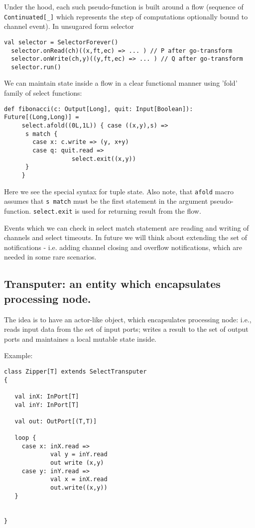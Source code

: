\documentclass[12pt]{article}
\begin{document}
  Under the hood, each such pseudo-function is built around a flow (sequence of \verb|Continuated[_]| which represents the step of computations optionally bound to channel event).  In unsugared form selector 

\begin{Verbatim}[fontsize=\small]
  val selector = SelectorForever()
  selector.onRead(ch)((x,ft,ec) => ... ) // P after go-transform
  selector.onWrite(ch,y)((y,ft,ec) => ... ) // Q after go-transform
  selector.run()
\end{Verbatim}

 We can maintain state inside a flow in a clear functional manner  using 'fold' family of select functions:

\begin{Verbatim}[fontsize=\small]
  def fibonacci(c: Output[Long], quit: Input[Boolean]): Future[(Long,Long)] =
     select.afold((0L,1L)) { case ((x,y),s) =>
      s match {
        case x: c.write => (y, x+y)
        case q: quit.read =>
                   select.exit((x,y))
      }
     }
\end{Verbatim}

  Here we see the special syntax for tuple state. Also note, that \verb|afold| macro assumes that \verb|s match| must be the first statement in the argument pseudo-function. \verb|select.exit| is used for returning result from the flow.
 
  Events which we can check in select match statement are reading and writing of channels and select timeouts. In future we will think about extending the set of notifications - i.e. adding channel closing and overflow notifications, which are needed in some rare scenarios.

\subsection{Transputer: an entity which encapsulates processing node. }

 The idea is to have an actor-like object, which encapsulates processing node: i.e., reads input data 
from the set of input ports; writes a result to the set of output ports and maintaines a local 
mutable state inside.

Example:

\begin{Verbatim}[fontsize=\small]
class Zipper[T] extends SelectTransputer
{
 
   val inX: InPort[T]
   val inY: InPort[T]

   val out: OutPort[(T,T)] 

   loop {
     case x: inX.read => 
             val y = inY.read
             out write (x,y)
     case y: inY.read =>
             val x = inX.read
             out.write((x,y)) 
   }


}
\end{Verbatim}
\end{document}
